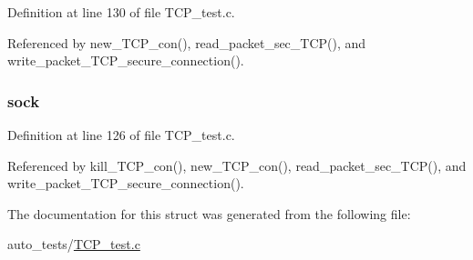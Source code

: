 Definition at line 130 of file T\+C\+P\+\_\+test.\+c.



Referenced by new\+\_\+\+T\+C\+P\+\_\+con(), read\+\_\+packet\+\_\+sec\+\_\+\+T\+C\+P(), and write\+\_\+packet\+\_\+\+T\+C\+P\+\_\+secure\+\_\+connection().

\hypertarget{structsec___t_c_p__con_a35b19d84fb632ca8ce5cab237f7089a5}{
\subsubsection[{sock}]{ sock}}\label{structsec___t_c_p__con_a35b19d84fb632ca8ce5cab237f7089a5}


Definition at line 126 of file T\+C\+P\+\_\+test.\+c.



Referenced by kill\+\_\+\+T\+C\+P\+\_\+con(), new\+\_\+\+T\+C\+P\+\_\+con(), read\+\_\+packet\+\_\+sec\+\_\+\+T\+C\+P(), and write\+\_\+packet\+\_\+\+T\+C\+P\+\_\+secure\+\_\+connection().



The documentation for this struct was generated from the following file\+:\begin{DoxyCompactItemize}
\item 
auto\+\_\+tests/\hyperlink{_t_c_p__test_8c}{T\+C\+P\+\_\+test.\+c}\end{DoxyCompactItemize}
